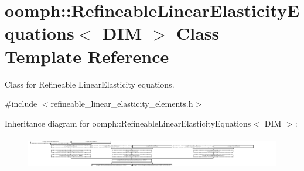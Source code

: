 \hypertarget{classoomph_1_1RefineableLinearElasticityEquations}{}\section{oomph\+:\+:Refineable\+Linear\+Elasticity\+Equations$<$ D\+IM $>$ Class Template Reference}
\label{classoomph_1_1RefineableLinearElasticityEquations}


Class for Refineable Linear\+Elasticity equations.  




{\ttfamily \#include $<$refineable\+\_\+linear\+\_\+elasticity\+\_\+elements.\+h$>$}

Inheritance diagram for oomph\+:\+:Refineable\+Linear\+Elasticity\+Equations$<$ D\+IM $>$\+:\begin{figure}[H]
\begin{center}
\leavevmode
\includegraphics[height=1.447028cm]{classoomph_1_1RefineableLinearElasticityEquations}
\end{center}
\end{figure}
